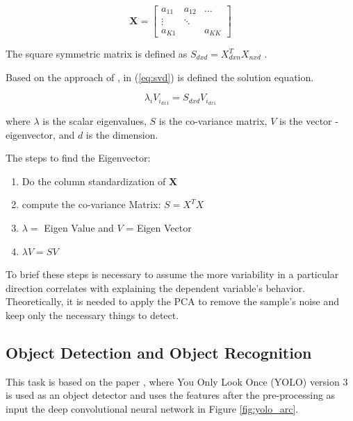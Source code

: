 \begin{equation}\label{eq:matrix}
    \mathbf{X} = \begin{bmatrix} 
    a_{11} & a_{12} & \dots \\
    \vdots & \ddots & \\
    a_{K1} &        & a_{KK} 
    \end{bmatrix}
\end{equation}

The square symmetric matrix is defined as $S_{dxd} = X^T_{dxn}X_{nxd}$ \cite{Halko_2011}. 

Based on the approach of \cite{cambridge2009introduction}, in (\ref{eq:svd}) is defined the solution equation.

\begin{equation}
    \label{eq:svd}
    \lambda_i V_{i_{dx1}} = S_{dxd}V_{i_{dx1}}
\end{equation}

where $\lambda$ is the scalar eigenvalues, $S$ is the co-variance matrix, $V$ is the vector - eigenvector, and $d$ is the dimension.

The steps to find the Eigenvector: 

\begin{enumerate}
    \item Do the column standardization of $\mathbf{X}$
    \item compute the co-variance Matrix: $S = X^TX$
    \item $\lambda = $ Eigen Value and $V$ = Eigen Vector
    \item $\lambda V = SV$
\end{enumerate}

To brief these steps is necessary to assume the more variability in a particular direction correlates with explaining the dependent variable's behavior. Theoretically, it is needed to apply the PCA to remove the sample's noise and keep only the necessary things to detect.


\subsection{Object Detection and Object Recognition} 

This task is based on the paper \cite{redmon2016you}, where You Only Look Once (YOLO) version 3 is used as an object detector and uses the features after the pre-processing as input the deep convolutional neural network in Figure \ref{fig:yolo_arc}.  

